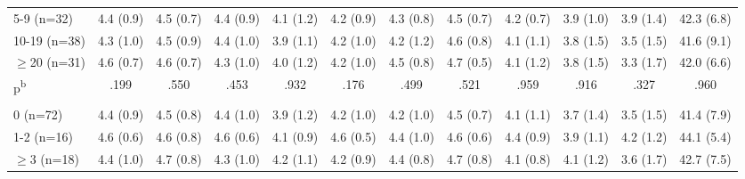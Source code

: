 \begin{landscape}
\begin{table}[htbp]
\begin{adjustbox}{scale=0.8, center}
\begin{threeparttable}
\begin{tabular}{@{}l@{\hspace{3pt}}c|c|c|c|c|c|c|c|c|c@{\hspace{3pt}}c@{}}
					5-9 (n=32)                                                                            & 4.4 (0.9) & 4.5 (0.7)                    & 4.4 (0.9)                    & 4.1 (1.2)                    & 4.2 (0.9) & 4.3 (0.8)                    & 4.5 (0.7) & 4.2 (0.7) & 3.9 (1.0) & 3.9 (1.4)                    & 42.3 (6.8) \\
					10-19 (n=38)                                                                          & 4.3 (1.0) & 4.5 (0.9)                    & 4.4 (1.0)                    & 3.9 (1.1)                    & 4.2 (1.0) & 4.2 (1.2)                    & 4.6 (0.8) & 4.1 (1.1) & 3.8 (1.5) & 3.5 (1.5)                    & 41.6 (9.1) \\
					$\geq$20 (n=31)                                                                       & 4.6 (0.7) & 4.6 (0.7)                    & 4.3 (1.0)                    & 4.0 (1.2)                    & 4.2 (1.0) & 4.5 (0.8)                    & 4.7 (0.5) & 4.1 (1.2) & 3.8 (1.5) & 3.3 (1.7)                    & 42.0 (6.6) \\
					p\textsuperscript{b}                                                                  & .199      & .550                         & .453                         & .932                         & .176      & .499                         & .521      & .959      & .916      & .327                         & .960       \\[0.5pt]
					\addlinespace[1pt]
					\multicolumn{12}{@{}l}{\textit{\scriptsize Quit Attempts}}                                                                                                                                                                                                                                                                \\
					0 (n=72)                                                                              & 4.4 (0.9) & 4.5 (0.8)                    & 4.4 (1.0)                    & 3.9 (1.2)                    & 4.2 (1.0) & 4.2 (1.0)                    & 4.5 (0.7) & 4.1 (1.1) & 3.7 (1.4) & 3.5 (1.5)                    & 41.4 (7.9) \\
					1-2 (n=16)                                                                            & 4.6 (0.6) & 4.6 (0.8)                    & 4.6 (0.6)                    & 4.1 (0.9)                    & 4.6 (0.5) & 4.4 (1.0)                    & 4.6 (0.6) & 4.4 (0.9) & 3.9 (1.1) & 4.2 (1.2)                    & 44.1 (5.4) \\
					$\geq$3 (n=18)                                                                        & 4.4 (1.0) & 4.7 (0.8)                    & 4.3 (1.0)                    & 4.2 (1.1)                    & 4.2 (0.9) & 4.4 (0.8)                    & 4.7 (0.8) & 4.1 (0.8) & 4.1 (1.2) & 3.6 (1.7)                    & 42.7 (7.5) \\

\end{tabular}
\end{threeparttable}
\end{adjustbox}
\end{table}
\end{landscape}
